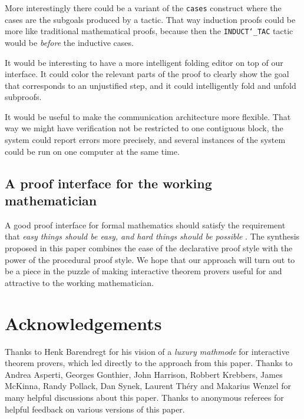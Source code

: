 \documentclass{LMCS}
\begin{document}
\begin{iteMize}{}
More interestingly there could be a variant of the \texttt{cases}
construct where the cases are the subgoals produced by a tactic.
That way induction proofs could be more like traditional mathematical proofs,
because then
the \texttt{INDUCT\char`\_TAC} tactic would be \emph{before} the
inductive cases.

\item
It would be interesting to have a more intelligent folding editor on top
of our interface.
It could color the relevant parts of the proof to
clearly show the goal that corresponds to an unjustified step,
and it could intelligently fold and unfold subproofs.

\item
It would be useful to make the communication architecture more flexible.
That way we might have verification not be restricted to one contiguous block,
the system could report errors more precisely,
and several instances of
the system could be run on one computer at the same time.

\end{iteMize}


\subsection{A proof interface for the working mathematician}

\noindent
A good proof interface for formal mathematics should satisfy the
requirement that
\emph{easy things should be easy, and hard things should be possible} \cite{bea:98}.
The synthesis proposed in this paper combines the ease of the declarative
proof style with the power of the procedural proof style.
We hope that our approach will turn out to be a piece in the puzzle
of making interactive theorem provers useful for and attractive to the
working mathematician.


\section*{Acknowledgements}

\noindent
Thanks to Henk Barendregt for his vision of a \emph{luxury mathmode} for interactive
theorem provers, which led directly to the approach from this paper.
Thanks to
Andrea Asperti,
Georges Gonthier,
John Harrison,
Robbert Krebbers,
James McKinna,
Randy Pollack,
Dan Synek,
Laurent Th\'ery and
Makarius Wenzel
for many helpful discussions about this paper.
Thanks to anonymous referees for helpful feedback on various versions of this paper.
\end{document}
